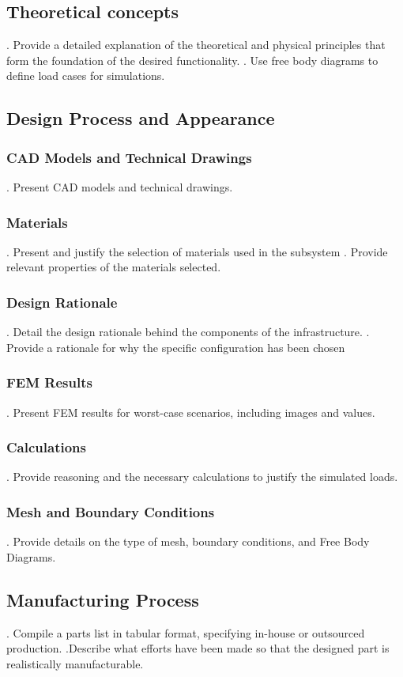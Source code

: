 \documentclass{article}
\begin{document}
\subsection{Theoretical concepts}
.  Provide a detailed explanation of the theoretical and physical principles that form the foundation of the desired functionality.
.  Use free body diagrams to define load cases for simulations.


\subsection{Design Process and Appearance}
\subsubsection{CAD Models and Technical Drawings}
.  Present CAD models and technical drawings.
\subsubsection{Materials}
.  Present and justify the selection of materials used in the subsystem
.  Provide relevant properties of the materials selected.
\subsubsection{Design Rationale}
.  Detail the design rationale behind the components of the infrastructure.
.  Provide a rationale for why the specific configuration has been chosen
\subsubsection{FEM Results}
.  Present FEM results for worst-case scenarios, including images and values.
\subsubsection{Calculations}
.  Provide reasoning and the necessary calculations to justify the simulated loads.
\subsubsection{Mesh and Boundary Conditions}
.  Provide details on the type of mesh, boundary conditions, and Free Body Diagrams.


\subsection{Manufacturing Process}
.  Compile a parts list in tabular format, specifying in-house or outsourced production.
.Describe what efforts have been made so that the designed part is realistically manufacturable.
\end{document}

